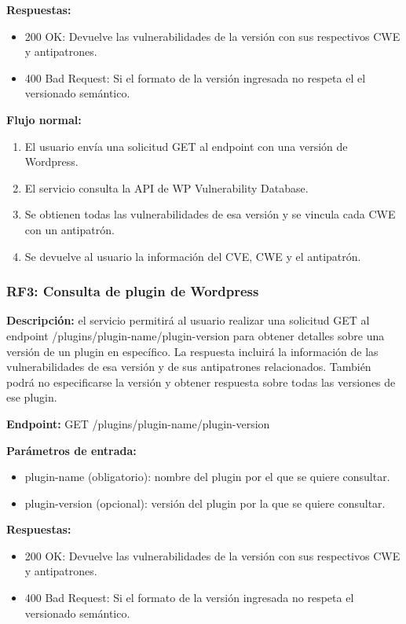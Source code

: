\textbf{Respuestas:}

\begin{itemize}
    \item 200 OK: Devuelve las vulnerabilidades de la versión con sus respectivos CWE y antipatrones.
    \item 400 Bad Request: Si el formato de la versión ingresada no respeta el el versionado semántico.
\end{itemize}

\textbf{Flujo normal:}

\begin{enumerate}
    \item El usuario envía una solicitud GET al endpoint con una versión de Wordpress.
    \item El servicio consulta la API de WP Vulnerability Database.
    \item Se obtienen todas las vulnerabilidades de esa versión y se vincula cada CWE con un antipatrón.
    \item Se devuelve al usuario la información del CVE, CWE y el antipatrón.
\end{enumerate}

\subsubsection{RF3: Consulta de plugin de Wordpress}

\textbf{Descripción:} el servicio permitirá al usuario realizar una solicitud GET al endpoint /plugins/{plugin-name}/{plugin-version} para obtener detalles sobre una versión de un plugin en específico. La respuesta incluirá la información de las vulnerabilidades de esa versión y de sus antipatrones relacionados. También podrá no especificarse la versión y obtener respuesta sobre todas las versiones de ese plugin.

\textbf{Endpoint:} GET /plugins/{plugin-name}/{plugin-version}

\textbf{Parámetros de entrada: }

\begin{itemize}
    \item plugin-name (obligatorio): nombre del plugin por el que se quiere consultar.
    \item plugin-version (opcional): versión del plugin por la que se quiere consultar.
\end{itemize}

\textbf{Respuestas:}

\begin{itemize}
    \item 200 OK: Devuelve las vulnerabilidades de la versión con sus respectivos CWE y antipatrones.
    \item 400 Bad Request: Si el formato de la versión ingresada no respeta el versionado semántico.
\end{itemize}

